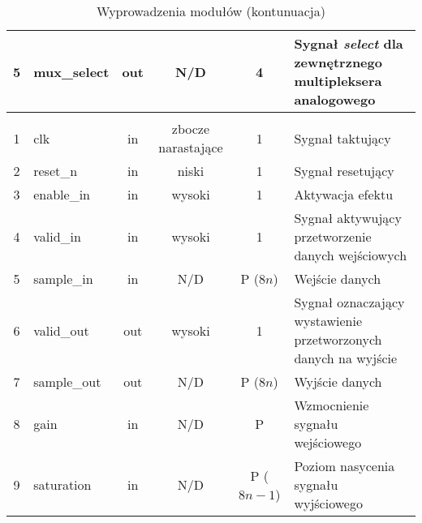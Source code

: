 \begin{table}[t]
\begin{tabular}{|c|l|c|c|c|m{4.5cm}|}
5            & mux\_select    & out          & N/D                   & 4                 & Sygnał \textit{select} dla zewnętrznego multipleksera analogowego \\ \hline
\rowcolor[HTML]{34CDF9}\multicolumn{6}{|l|}{Efekt \textit{overdiver}} \\ \hline
1            & clk            & in           & zbocze narastające    & 1                 & Sygnał taktujący                                                  \\ \hline
2            & reset\_n       & in           & niski                 & 1                 & Sygnał resetujący                                                 \\ \hline
3            & enable\_in     & in           & wysoki                & 1                 & Aktywacja efektu                                                  \\ \hline
4            & valid\_in      & in           & wysoki                & 1                 & Sygnał aktywujący przetworzenie danych wejściowych                \\ \hline
5            & sample\_in     & in           & N/D                   & P ($8n$)          & Wejście danych                                                    \\ \hline
6            & valid\_out     & out          & wysoki                & 1                 & Sygnał oznaczający wystawienie przetworzonych danych na wyjście   \\ \hline
7            & sample\_out    & out          & N/D                   & P ($8n$)          & Wyjście danych                                                    \\ \hline
8            & gain           & in           & N/D                   & P                 & Wzmocnienie sygnału wejściowego                                   \\ \hline
9            & saturation     & in           & N/D                   & P ($8n-1$)        & Poziom nasycenia sygnału wyjściowego                              \\ \hline
\end{tabular}
\caption{Wyprowadzenia modułów (kontunuacja)}
\end{table}

